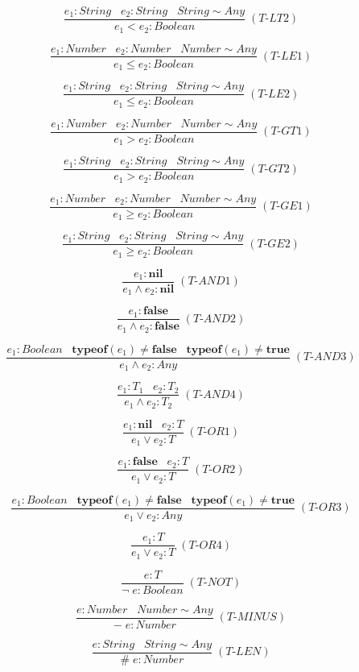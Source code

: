 \documentclass[12pt]{article}
\begin{document}
\[
\frac{e_{1}:String \;\;\; e_{2}:String \;\;\; String \sim Any}
     {e_{1} < e_{2} : Boolean} \; (\textit{T-LT2})
\]

\[
\frac{e_{1}:Number \;\;\; e_{2}:Number \;\;\; Number \sim Any}
     {e_{1} \le e_{2} : Boolean} \; (\textit{T-LE1})
\]

\[
\frac{e_{1}:String \;\;\; e_{2}:String \;\;\; String \sim Any}
     {e_{1} \le e_{2} : Boolean} \; (\textit{T-LE2})
\]

\[
\frac{e_{1}:Number \;\;\; e_{2}:Number \;\;\; Number \sim Any}
     {e_{1} > e_{2} : Boolean} \; (\textit{T-GT1})
\]

\[
\frac{e_{1}:String \;\;\; e_{2}:String \;\;\; String \sim Any}
     {e_{1} > e_{2} : Boolean} \; (\textit{T-GT2})
\]

\[
\frac{e_{1}:Number \;\;\; e_{2}:Number \;\;\; Number \sim Any}
     {e_{1} \ge e_{2} : Boolean} \; (\textit{T-GE1})
\]

\[
\frac{e_{1}:String \;\;\; e_{2}:String \;\;\; String \sim Any}
     {e_{1} \ge e_{2} : Boolean} \; (\textit{T-GE2})
\]

\[
\frac{e_{1}:\textbf{nil}}
     {e_{1} \land e_{2} : \textbf{nil}} \; (\textit{T-AND1})
\]

\[
\frac{e_{1}:\textbf{false}}
     {e_{1} \land e_{2} : \textbf{false}} \; (\textit{T-AND2})
\]

\[
\frac{e_{1}:Boolean \;\;\;
\textbf{typeof}(e_{1}) \not= \textbf{false} \;\;\;
\textbf{typeof}(e_{1}) \not= \textbf{true}}
     {e_{1} \land e_{2} : Any} \; (\textit{T-AND3})
\]

\[
\frac{e_{1}:T_{1} \;\;\; e_{2}:T_{2}}
     {e_{1} \land e_{2} : T_{2}} \; (\textit{T-AND4})
\]

\[
\frac{e_{1}:\textbf{nil} \;\;\; e_{2}:T}
     {e_{1} \lor e_{2} : T} \; (\textit{T-OR1})
\]

\[
\frac{e_{1}:\textbf{false} \;\;\; e_{2}:T}
     {e_{1} \lor e_{2} : T} \; (\textit{T-OR2})
\]

\[
\frac{e_{1}:Boolean \;\;\;
\textbf{typeof}(e_{1}) \not= \textbf{false} \;\;\;
\textbf{typeof}(e_{1}) \not= \textbf{true}}
     {e_{1} \lor e_{2} : Any} \; (\textit{T-OR3})
\]

\[
\frac{e_{1}:T}
     {e_{1} \lor e_{2} : T} \; (\textit{T-OR4})
\]

\[
\frac{e : T}
     {\lnot \; e : Boolean} \; (\textit{T-NOT})
\]

\[
\frac{e : Number \;\;\; Number \sim Any}
     {- \; e : Number} \; (\textit{T-MINUS})
\]

\[
\frac{e : String \;\;\; String \sim Any}
     {\# \; e : Number} \; (\textit{T-LEN})
\]
\end{document}
